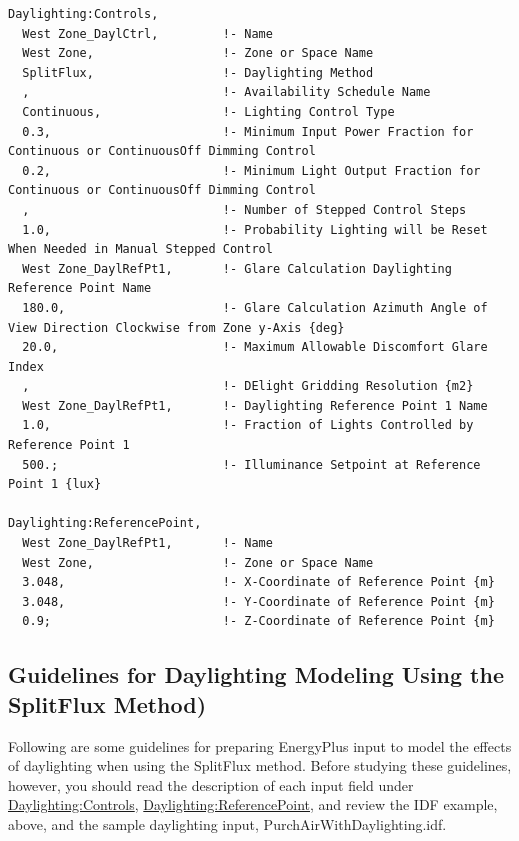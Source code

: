 \begin{lstlisting}
Daylighting:Controls,
  West Zone_DaylCtrl,         !- Name
  West Zone,                  !- Zone or Space Name
  SplitFlux,                  !- Daylighting Method
  ,                           !- Availability Schedule Name
  Continuous,                 !- Lighting Control Type
  0.3,                        !- Minimum Input Power Fraction for Continuous or ContinuousOff Dimming Control
  0.2,                        !- Minimum Light Output Fraction for Continuous or ContinuousOff Dimming Control
  ,                           !- Number of Stepped Control Steps
  1.0,                        !- Probability Lighting will be Reset When Needed in Manual Stepped Control
  West Zone_DaylRefPt1,       !- Glare Calculation Daylighting Reference Point Name
  180.0,                      !- Glare Calculation Azimuth Angle of View Direction Clockwise from Zone y-Axis {deg}
  20.0,                       !- Maximum Allowable Discomfort Glare Index
  ,                           !- DElight Gridding Resolution {m2}
  West Zone_DaylRefPt1,       !- Daylighting Reference Point 1 Name
  1.0,                        !- Fraction of Lights Controlled by Reference Point 1
  500.;                       !- Illuminance Setpoint at Reference Point 1 {lux}

Daylighting:ReferencePoint,
  West Zone_DaylRefPt1,       !- Name
  West Zone,                  !- Zone or Space Name
  3.048,                      !- X-Coordinate of Reference Point {m}
  3.048,                      !- Y-Coordinate of Reference Point {m}
  0.9;                        !- Z-Coordinate of Reference Point {m}
\end{lstlisting}

\subsection{Guidelines for Daylighting Modeling Using the SplitFlux Method)}\label{guidelines-for-daylighting-modeling-splitflux-method}

Following are some guidelines for preparing EnergyPlus input to model the effects of daylighting when using the SplitFlux method. Before studying these guidelines, however, you should read the description of each input field under \hyperref[daylightingcontrols-000]{Daylighting:Controls}, \hyperref[daylightingreferencepoint-000]{Daylighting:ReferencePoint}, and review the IDF example, above, and the sample daylighting input, PurchAirWithDaylighting.idf.

